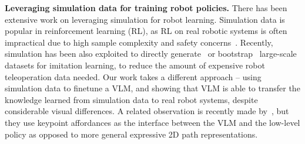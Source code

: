 \textbf{Leveraging simulation data for training robot policies.}
There has been extensive work on leveraging simulation for robot learning. Simulation data is popular in reinforcement learning (RL), as RL on real robotic systems is often impractical due to high sample complexity and safety concerns~\citep{lee2020learning,handa2023dextreme,torne2024reconciling}. Recently, simulation has been also exploited to directly generate~\citep{fishman22mpn} or bootstrap~\citep{mandlekar2023mimicgen} large-scale datasets for imitation learning, to reduce the amount of expensive robot teleoperation data needed. Our work takes a different approach -- using simulation data to finetune a VLM, and showing that VLM is able to transfer the knowledge learned from simulation data to real robot systems, despite considerable visual differences. A related observation is recently made by~\citep{yuan2024robopoint}, but they use keypoint affordances as the interface between the VLM and the low-level policy as opposed to more general expressive 2D path representations.


